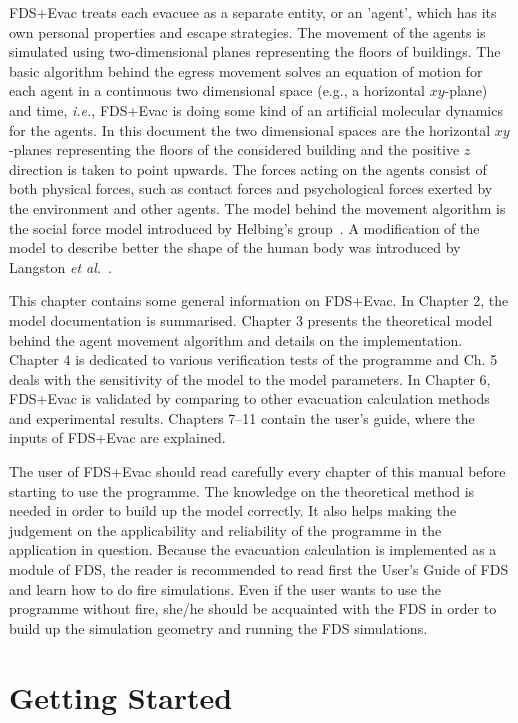 \documentclass[12pt,a4paper,final,twoside]{stylevk}
\begin{document}
FDS+Evac treats each evacuee as a separate entity, or an 'agent',
which has its own personal properties and escape strategies.  The
movement of the agents is simulated using two-dimensional planes
representing the floors of buildings.  The basic algorithm behind the
egress movement solves an equation of motion for each agent in a
continuous two dimensional space (e.g., a horizontal $xy$-plane) and
time, \emph{i.e.}, FDS+Evac is doing some kind of an artificial
molecular dynamics for the agents.  In this document the two
dimensional spaces are the horizontal $xy$-planes representing the
floors of the considered building and the positive $z$ direction is
taken to point upwards.  The forces acting on the agents consist of
both physical forces, such as contact forces and psychological forces
exerted by the environment and other agents.  The model behind the
movement algorithm is the social force model introduced by Helbing's
group~\cite{Helbing95, Helbing00, Helbing02, Werner03}.  A
modification of the model to describe better the shape of the human
body was introduced by Langston \emph{et al.}~\cite{Langston06}.


This chapter contains some general information on FDS+Evac.  In
Chapter 2, the model documentation is summarised.  Chapter 3 presents
the theoretical model behind the agent movement algorithm and details
on the implementation.  Chapter 4 is dedicated to various verification
tests of the programme and Ch. 5 deals with the sensitivity of the
model to the model parameters.  In Chapter 6, FDS+Evac is validated by
comparing to other evacuation calculation methods and experimental
results.  Chapters 7--11 contain the user's guide, where the inputs of
FDS+Evac are explained.


The user of FDS+Evac should read carefully every chapter of this
manual before starting to use the programme.  The knowledge on the
theoretical method is needed in order to build up the model correctly.
It also helps making the judgement on the applicability and
reliability of the programme in the application in question.  Because
the evacuation calculation is implemented as a module of FDS, the
reader is recommended to read first the User's Guide of FDS and learn
how to do fire simulations.  Even if the user wants to use the
programme without fire, she/he should be acquainted with the FDS in
order to build up the simulation geometry and running the FDS
simulations.


\section{Getting Started}\label{Sec_GetStart}
\end{document}
